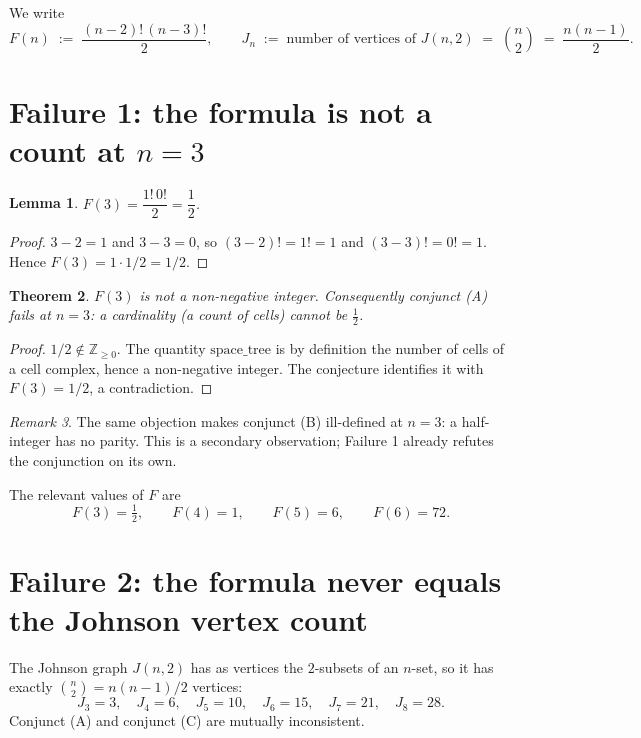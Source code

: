 \documentclass[11pt]{article}
\newtheorem{theorem}{Theorem}
\newtheorem{lemma}[theorem]{Lemma}
\theoremstyle{definition}
\theoremstyle{remark}
\newtheorem{remark}[theorem]{Remark}
\begin{document}
We write
\[
F(n) \;:=\; \frac{(n-2)!\,(n-3)!}{2},
\qquad
J_n \;:=\; \text{number of vertices of } J(n,2) \;=\; \binom{n}{2} \;=\; \frac{n(n-1)}{2}.
\]

\section{Failure 1: the formula is not a count at $n=3$}

\begin{lemma}
$F(3) = \dfrac{1!\,0!}{2} = \dfrac{1}{2}$.
\end{lemma}

\begin{proof}
$3 - 2 = 1$ and $3 - 3 = 0$, so $(3-2)! = 1! = 1$ and $(3-3)! = 0! = 1$.
Hence $F(3) = 1 \cdot 1 / 2 = 1/2$.
\end{proof}

\begin{theorem}
$F(3)$ is not a non-negative integer. Consequently conjunct (A) fails at $n = 3$:
a cardinality (a count of cells) cannot be $\tfrac12$.
\end{theorem}

\begin{proof}
$1/2 \notin \mathbb{Z}_{\ge 0}$. The quantity $\mathrm{space\_tree}$ is by
definition the number of cells of a cell complex, hence a non-negative integer.
The conjecture identifies it with $F(3) = 1/2$, a contradiction.
\end{proof}

\begin{remark}
The same objection makes conjunct (B) ill-defined at $n = 3$: a half-integer has
no parity. This is a secondary observation; Failure 1 already refutes the
conjunction on its own.
\end{remark}

The relevant values of $F$ are
\[
F(3) = \tfrac12,\qquad F(4) = 1,\qquad F(5) = 6,\qquad F(6) = 72 .
\]

\section{Failure 2: the formula never equals the Johnson vertex count}

The Johnson graph $J(n,2)$ has as vertices the $2$-subsets of an $n$-set, so it has
exactly $\binom{n}{2} = n(n-1)/2$ vertices:
\[
J_3 = 3,\quad J_4 = 6,\quad J_5 = 10,\quad J_6 = 15,\quad J_7 = 21,\quad J_8 = 28 .
\]
Conjunct (A) and conjunct (C) are mutually inconsistent.
\end{document}
